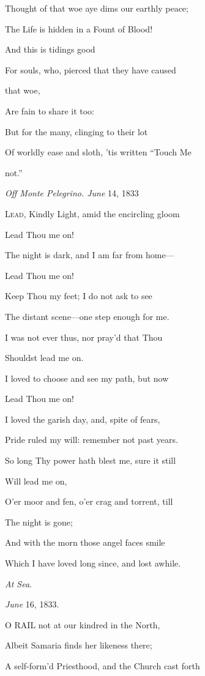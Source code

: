 Thought of that woe aye dims our earthly peace;

The Life is hidden in a Fount of Blood!

And this is tidings good

For souls, who, pierced that they have caused

that woe,

Are fain to share it too:

But for the many, clinging to their lot

Of worldly ease and sloth, 'tis written ``Touch Me

not.''

\emph{Off Monte Pelegrino. June} 14, 1833


L\textsc{ead}, Kindly Light, amid the encircling gloom

Lead Thou me on!

The night is dark, and I am far from home—

Lead Thou me on!

Keep Thou my feet; I do not ask to see

The distant scene—one step enough for me.

I was not ever thus, nor pray'd that Thou

Shouldst lead me on.

I loved to choose and see my path, but now

Lead Thou me on!

I loved the garish day, and, spite of fears,

Pride ruled my will: remember not past years.

So long Thy power hath blest me, sure it still

Will lead me on,

O'er moor and fen, o'er crag and torrent, till

The night is gone;

And with the morn those angel faces smile

Which I have loved long since, and lost awhile.

\emph{At Sea}.

\emph{June} 16, 1833.


O RAIL not at our kindred in the North,

Albeit Samaria finds her likeness there;

A self-form'd Priesthood, and the Church cast forth

